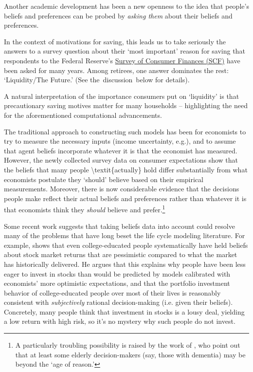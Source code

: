 \documentclass{article}
\begin{document}
Another academic development has been a new openness to the idea that people's beliefs and preferences can be probed by \textit{asking them} about their beliefs and preferences.

In the context of motivations for saving, this leads us to take seriously the answers to a survey question about their `most important' reason for saving that respondents to the Federal Reserve's \href{https://www.federalreserve.gov/econres/scfindex.htm}{Survey of Consumer Finances (SCF)} have been asked for many years.
Among retirees, one answer dominates the rest: `Liquidity/The Future.'  (See the~discussion~below for details).

A natural interpretation of the importance consumers put on `liquidity' is that precautionary saving motives matter for many households -- highlighting the need for the aforementioned computational advancements.

The traditional approach to constructing such models has been for economists to try to measure the necessary inputs (income uncertainty, e.g.), and to assume that agent beliefs incorporate whatever it is that the economist has measured.
However, the newly collected survey data on consumer expectations show that the beliefs that many people {\textbackslash}textit\{actually\} hold differ substantially from what economists postulate they `should' believe based on their empirical measurements.
Moreover, there is now considerable evidence that the decisions people make reflect their actual beliefs and preferences rather than whatever it is that economists think they \textit{should} believe and prefer.\footnote{A particularly troubling possibility is raised by the work of \cite{gabaix2010age}, who point out that at least some elderly decision-makers (say, those with dementia) may be beyond the `age of reason.'}


Some recent work suggests that taking beliefs data into account could resolve many of the problems that have long beset the life cycle modeling literature.
For example, \cite{velasquezgiraldoJMP} shows that even college-educated people systematically have held beliefs about stock market returns that are pessimistic compared to what the market has historically delivered.
He argues that this explains why people have been less eager to invest in stocks than would be predicted by models calibrated with economists' more optimistic expectations, and that the portfolio investment behavior of college-educated people over most of their lives is reasonably consistent with \textit{subjectively} rational decision-making (i.e. given their beliefs).
Concretely, many people think that investment in stocks is a lousy deal, yielding a low return with high risk, so it's no mystery why such people do not invest.
\end{document}

